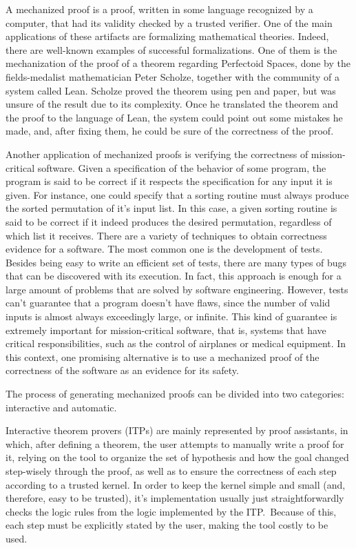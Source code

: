 A mechanized proof is a proof, written in some language recognized by a computer, that had its validity checked by a trusted verifier. One of the main applications of these artifacts are formalizing mathematical theories. Indeed, there are well-known examples of successful formalizations. One of them is the mechanization of the proof of a theorem regarding Perfectoid Spaces\cite{scholze}, done by the fields-medalist mathematician Peter Scholze, together with the community of a system called Lean\cite{lean}. Scholze proved the theorem using pen and paper, but was unsure of the result due to its complexity. Once he translated the theorem and the proof to the language of Lean, the system could point out some mistakes he made, and, after fixing them, he could be sure of the correctness of the proof.

Another application of mechanized proofs is verifying the correctness of mission-critical software. Given a specification of the behavior of some program, the program is said to be correct if it respects the specification for any input it is given. For instance, one could specify that a sorting routine must always produce the sorted permutation of it's input list. In this case, a given sorting routine is said to be correct if it indeed produces the desired permutation, regardless of which list it receives. There are a variety of techniques to obtain correctness evidence for a software. The most common one is the development of tests. Besides being easy to write an efficient set of tests, there are many types of bugs that can be discovered with its execution. In fact, this approach is enough for a large amount of problems that are solved by software engineering. However, tests can’t guarantee that a program doesn’t have flaws, since the number of valid inputs is almost always exceedingly large, or infinite. This kind of guarantee is extremely important for mission-critical software, that is, systems that have critical responsibilities, such as the control of airplanes or medical equipment. In this context, one promising alternative is to use a mechanized proof of the correctness of the software as an evidence for its safety.

The process of generating mechanized proofs can be divided into
two categories: interactive and automatic.

Interactive theorem provers (ITPs) are mainly represented by proof assistants, in which, after defining
a theorem, the user attempts to manually write a proof for it,
relying on the tool to organize the set of hypothesis and
how the goal changed step-wisely through the proof, as well as to ensure the
correctness of each step according to a trusted kernel.
%
In order to keep the kernel simple and small (and, therefore, easy to be trusted), it's implementation usually just straightforwardly checks the logic rules from the logic implemented by the ITP.\ Because of this, each step must be explicitly stated by the user, making the tool costly to be used.
%

